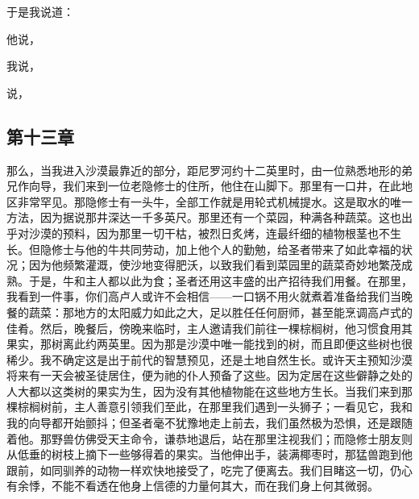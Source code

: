 于是我说道：\par

他说，\par

我说，\par

 说，\par


\subsection{第十三章}

那么，当我进入沙漠最靠近的部分，距尼罗河约十二英里时，由一位熟悉地形的弟兄作向导，我们来到一位老隐修士的住所，他住在山脚下。那里有一口井，在此地区非常罕见。那隐修士有一头牛，全部工作就是用轮式机械提水。这是取水的唯一方法，因为据说那井深达一千多英尺。那里还有一个菜园，种满各种蔬菜。这也出乎对沙漠的预料，因为那里一切干枯，被烈日炙烤，连最纤细的植物根茎也不生长。但隐修士与他的牛共同劳动，加上他个人的勤勉，给圣者带来了如此幸福的状况；因为他频繁灌溉，使沙地变得肥沃，以致我们看到菜园里的蔬菜奇妙地繁茂成熟。于是，牛和主人都以此为食；圣者还用这丰盛的出产招待我们用餐。在那里，我看到一件事，你们高卢人或许不会相信——一口锅不用火就煮着准备给我们当晚餐的蔬菜：那地方的太阳威力如此之大，足以胜任任何厨师，甚至能烹调高卢式的佳肴。然后，晚餐后，傍晚来临时，主人邀请我们前往一棵棕榈树，他习惯食用其果实，那树离此约两英里。因为那是沙漠中唯一能找到的树，而且即便这些树也很稀少。我不确定这是出于前代的智慧预见，还是土地自然生长。或许天主预知沙漠将来有一天会被圣徒居住，便为祂的仆人预备了这些。因为定居在这些僻静之处的人大都以这类树的果实为生，因为没有其他植物能在这些地方生长。当我们来到那棵棕榈树前，主人善意引领我们至此，在那里我们遇到一头狮子；一看见它，我和我的向导都开始颤抖；但圣者毫不犹豫地走上前去，我们虽然极为恐惧，还是跟随着他。那野兽仿佛受天主命令，谦恭地退后，站在那里注视我们；而隐修士朋友则从低垂的树枝上摘下一些够得着的果实。当他伸出手，装满椰枣时，那猛兽跑到他跟前，如同驯养的动物一样欢快地接受了，吃完了便离去。我们目睹这一切，仍心有余悸，不能不看透在他身上信德的力量何其大，而在我们身上何其微弱。\par

